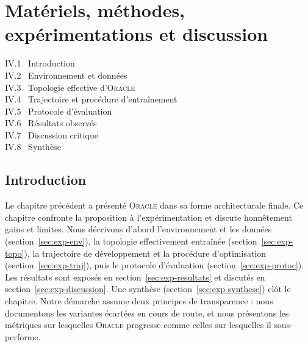 \documentclass[14pt,a4paper,openany]{extreport}
\newcommand{\Oracle}{\textsc{Oracle}}
\begin{document}
\chapter{Matériels, méthodes, expérimentations et discussion}
\label{chap:experiences}

\begin{sommairebox}
\small
\noindent IV.1 \ Introduction \dotfill \pageref{sec:exp-intro}\\
\noindent IV.2 \ Environnement et données \dotfill \pageref{sec:exp-env}\\
\noindent IV.3 \ Topologie effective d'\Oracle{} \dotfill \pageref{sec:exp-topo}\\
\noindent IV.4 \ Trajectoire et procédure d'entraînement \dotfill \pageref{sec:exp-traj}\\
\noindent IV.5 \ Protocole d'évaluation \dotfill \pageref{sec:exp-protoc}\\
\noindent IV.6 \ Résultats observés \dotfill \pageref{sec:exp-resultats}\\
\noindent IV.7 \ Discussion critique \dotfill \pageref{sec:exp-discussion}\\
\noindent IV.8 \ Synthèse \dotfill \pageref{sec:exp-synthese}
\end{sommairebox}

\vspace{1em}

\section{Introduction}
\label{sec:exp-intro}

Le chapitre précédent a présenté \Oracle{} dans sa forme architecturale finale. Ce chapitre confronte la proposition à l'expérimentation et discute honnêtement gains et limites. Nous décrivons d'abord l'environnement et les données (section~\ref{sec:exp-env}), la topologie effectivement entraînée (section~\ref{sec:exp-topo}), la trajectoire de développement et la procédure d'optimisation (section~\ref{sec:exp-traj}), puis le protocole d'évaluation (section~\ref{sec:exp-protoc}). Les résultats sont exposés en section~\ref{sec:exp-resultats} et discutés en section~\ref{sec:exp-discussion}. Une synthèse (section~\ref{sec:exp-synthese}) clôt le chapitre. Notre démarche assume deux principes de transparence : nous documentons les variantes écartées en cours de route, et nous présentons les métriques sur lesquelles \Oracle{} progresse comme celles sur lesquelles il sous-performe.
\end{document}
